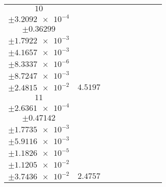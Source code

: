 \documentclass[8pt]{article}
\begin{document}
\begin{longtable}[l]{c c c c c c c c c}
$\num{10}$ & \begin{tabular}[c]{@{}c@{}}$\num{5.8357e-2}$ \\ $\pm\num{3.2092e-4}$\end{tabular} & \begin{tabular}[c]{@{}c@{}}$\num{9.557e-2}$ \\ $\pm\num{0.36299}$\end{tabular} & \begin{tabular}[c]{@{}c@{}}$\num{4.3328}$ \\ $\pm\num{1.7922e-3}$\end{tabular} & \begin{tabular}[c]{@{}c@{}}$\num{3.5874e+3}$ \\ $\pm\num{4.1657e-3}$\end{tabular} & \begin{tabular}[c]{@{}c@{}}$\num{7.1769}$ \\ $\pm\num{8.3337e-6}$\end{tabular} & \begin{tabular}[c]{@{}c@{}}$\num{1.5971}$ \\ $\pm\num{8.7247e-3}$\end{tabular} & \begin{tabular}[c]{@{}c@{}}$\num{4.5007}$ \\ $\pm\num{2.4815e-2}$\end{tabular} & $\num{4.5197}$\\
$\num{11}$ & \begin{tabular}[c]{@{}c@{}}$\num{3.1547e-2}$ \\ $\pm\num{2.6361e-4}$\end{tabular} & \begin{tabular}[c]{@{}c@{}}$\num{-0.60547}$ \\ $\pm\num{0.47142}$\end{tabular} & \begin{tabular}[c]{@{}c@{}}$\num{-8.2049}$ \\ $\pm\num{1.7735e-3}$\end{tabular} & \begin{tabular}[c]{@{}c@{}}$\num{3.6186e+3}$ \\ $\pm\num{5.9116e-3}$\end{tabular} & \begin{tabular}[c]{@{}c@{}}$\num{7.2392}$ \\ $\pm\num{1.1826e-5}$\end{tabular} & \begin{tabular}[c]{@{}c@{}}$\num{1.1884}$ \\ $\pm\num{1.1205e-2}$\end{tabular} & \begin{tabular}[c]{@{}c@{}}$\num{4.3145}$ \\ $\pm\num{3.7436e-2}$\end{tabular} & $\num{2.4757}$\\

\end{longtable}
\end{document}
